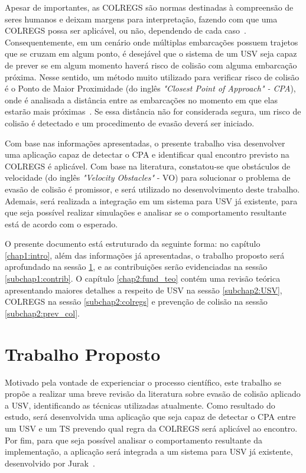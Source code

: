     Apesar de importantes, as COLREGS são normas destinadas à compreensão de seres humanos e deixam margens para interpretação, fazendo com que uma COLREGS possa ser aplicável, ou não, dependendo de cada caso~\cite{KUWATA2014110}. Consequentemente, em um cenário onde múltiplas embarcações possuem trajetos que se cruzam em algum ponto, é desejável que o sistema de um USV seja capaz de prever se em algum momento haverá risco de colisão com alguma embarcação próxima. Nesse sentido, um método muito utilizado para verificar risco de colisão é o Ponto de Maior Proximidade (do inglês \textit{"Closest Point of Approach" - CPA}), onde é analisada a distância entre as embarcações no momento em que elas estarão mais próximas~\cite{HUANG2019142}. Se essa distância não for considerada segura, um risco de colisão é detectado e um procedimento de evasão deverá ser iniciado.
    
    Com base nas informações apresentadas, o presente trabalho visa desenvolver uma aplicação capaz de detectar o CPA e identificar qual encontro previsto na COLREGS é aplicável. Com base na literatura, constatou-se que obstáculos de velocidade (do inglês \textit{"Velocity Obstacles"} - VO) para solucionar o problema de evasão de colisão é promissor, e será utilizado no desenvolvimento deste trabalho. Ademais, será realizada a integração em um sistema para USV já existente, para que seja possível realizar simulações e analisar se o comportamento resultante está de acordo com o esperado. 
    
    O presente documento está estruturado da seguinte forma: no capítulo \ref{chap1:intro}, além das informações já apresentadas, o trabalho proposto será aprofundado na sessão \ref{subchap1:trab_prop}, e as contribuições serão evidenciadas na sessão \ref{subchap1:contrib}. O capítulo \ref{chap2:fund_teo} contém uma revisão teórica apresentando maiores detalhes a respeito de USV na sessão \ref{subchap2:USV}, COLREGS na sessão \ref{subchap2:colregs} e prevenção de colisão na sessão \ref{subchap2:prev_col}.
    
    \section{Trabalho Proposto}\label{subchap1:trab_prop}
        Motivado pela vontade de experienciar o processo científico, este trabalho se propõe a realizar uma breve revisão da literatura sobre evasão de colisão aplicado a USV, identificando as técnicas utilizadas atualmente. Como resultado do estudo, será desenvolvida uma aplicação que seja capaz de detectar o CPA entre um USV e um TS prevendo qual regra da COLREGS será aplicável ao encontro. Por fim, para que seja possível analisar o comportamento resultante da implementação, a aplicação será integrada a um sistema para USV já existente, desenvolvido por Jurak~\cite{JURAK2020}.
        
